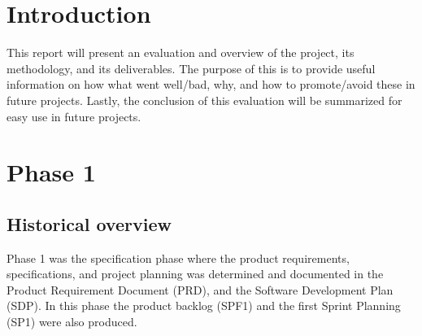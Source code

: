 \documentclass{article}
\begin{document}
\tableofcontents
\newpage


\section{Introduction}
This report will present an evaluation and overview of the project, its methodology, and its deliverables. The purpose of this is to provide useful information on how what went well/bad, why, and how to promote/avoid these in future projects. Lastly, the conclusion of this evaluation will be summarized for easy use in future projects.

\section{Phase 1}
\subsection{Historical overview}

Phase 1 was the specification phase where the product requirements, specifications, and project planning was determined and documented in the Product Requirement Document (PRD)\cite{PRD}, and the Software Development Plan (SDP)\cite{SDP}. In this phase the product backlog (SPF1)\cite{SPF1} and the first Sprint Planning (SP1)\cite{SP1} were also produced. 
\end{document}
